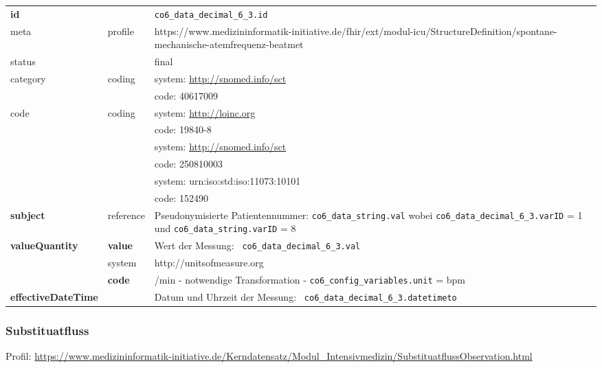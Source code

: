\begin{longtable}{|l|l|p{7.5cm}|}
        \hline
        \rowcolor{lightgray} \multicolumn{3}{|l|}{Data Mapping (inhaltlich)} \\ \hline
        \textbf{id} &  & \texttt{co6\_data\_decimal\_6\_3.id} \\ \hline
	meta & profile & https://www.medizininformatik-initiative.de/fhir/ext/modul-icu/StructureDefinition/spontane-mechanische-atemfrequenz-beatmet \\ \hline 
	status &  & final   \\ \hline 
	category & coding & system: \url{http://snomed.info/sct} \\
\cline{3-3}
	& & code: 40617009 \\ \hline
	code & coding & system: \url{http://loinc.org} \\ 
	\cline{3-3} 
	&  & code: 19840-8 \\ 
	\cline{3-3} 
	&  & system: \url{http://snomed.info/sct} \\ 
	\cline{3-3}
	&  & code: 250810003 \\ 
	\cline{3-3} 
	&  & system: urn:iso:std:iso:11073:10101 \\ 
	\cline{3-3}
	&  & code: 152490 \\ \hline
	 \textbf{subject} & reference & Pseudonymisierte Patientennummer: \texttt{co6\_data\_string.val} wobei \texttt{co6\_data\_decimal\_6\_3.varID} = 1 und \texttt{co6\_data\_string.varID} = 8 \\ \hline
	 \textbf{valueQuantity}  & \textbf{value} & Wert der Messung: \texttt{
co6\_data\_decimal\_6\_3.val} \\
        \cline{2-3}
         & system & http://unitsofmeasure.org \\
         \cline{2-3}
         & \textbf{code} & /min - notwendige Transformation - \texttt{co6\_config\_variables.unit} = bpm \\ \hline
     \textbf{effectiveDateTime}  & & Datum und Uhrzeit der Messung: \texttt{
co6\_data\_decimal\_6\_3.datetimeto} \\ \hline
\end{longtable}


\subsubsection{Substituatfluss} 
 Profil: \url{https://www.medizininformatik-initiative.de/Kerndatensatz/Modul_Intensivmedizin/SubstituatflussObservation.html}

